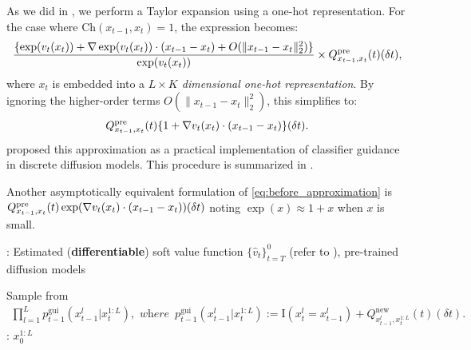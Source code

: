 As we did in , we perform a Taylor expansion using a one-hot representation. For the case where $\mathrm{Ch}(x_{t-1}, x_{t})=1$, the expression becomes:
\begin{align*}
   \frac{ \{\exp(v_{t}(x_{t})) +  \nabla \exp(v_{t}(x_{t}))\cdot (x_{t-1}-x_t) + O( \|x_{t-1}-x_t\|^2_2 ) \} }{ \exp(v_{t}(x_{t})) }\times Q^{\mathrm{pre}}_{x_{t-1},x_t}(t)  (\delta t), 
\end{align*}
where $x_t$ is embedded into a \emph{$L\times K$ dimensional one-hot representation}. 
By ignoring the higher-order terms $O( \|x_{t-1}-x_t\|^2_2 )$, this simplifies to:
\begin{align}\label{eq:before_approximation}
   Q^{\mathrm{pre}}_{x_{t-1},x_t}(t)\{ 1  +   \nabla v_{t}(x_{t}) \cdot (x_{t-1}-x_t) \}   (\delta t). 
\end{align}
\citet{nisonoff2024unlocking} proposed this approximation as a practical implementation of classifier guidance in discrete diffusion models. This procedure is summarized in . 

\begin{remark} Another asymptotically equivalent formulation of \eqref{eq:before_approximation}  is  $ Q^{\mathrm{pre}}_{x_{t-1},x_t}(t)\exp(\nabla v_{t}(x_{t}) \cdot (x_{t-1}-x_t))  (\delta t)$ noting $\exp(x)\approx 1+x$ when $x$ is small. 
\end{remark}

\begin{algorithm}[!th]
\caption{Classifier Guidance with Taylor Approximation in Discrete Diffusion Models \citep{nisonoff2024unlocking}  }\label{alg:claasify_dscrete2}
\begin{algorithmic}[1]
     : Estimated (\textbf{differentiable}) soft value function $\{\hat v_t\}_{t=T}^0$ (refer to ), pre-trained diffusion models 

        \STATE  Sample from 
        \begin{align*}
    \prod_{l=1}^L p^{\mathrm{gui}}_{t-1}(x^{l}_{t-1} | x^{1:L}_{t}),\,\, \textit{where}\,\,\,   p^{\mathrm{gui}}_{t-1}(x^{l}_{t-1} | x^{1:L}_{t}):=\mathrm{I}(x^l_t=x^l_{t-1}) + Q^{\mathrm{new}}_{x^l_{t-1}, x^{1:L}_{t} }(t)   (\delta t). 
\end{align*}
     \ENDFOR
  : $x^{1:L}_0$
\end{algorithmic}
\end{algorithm}

